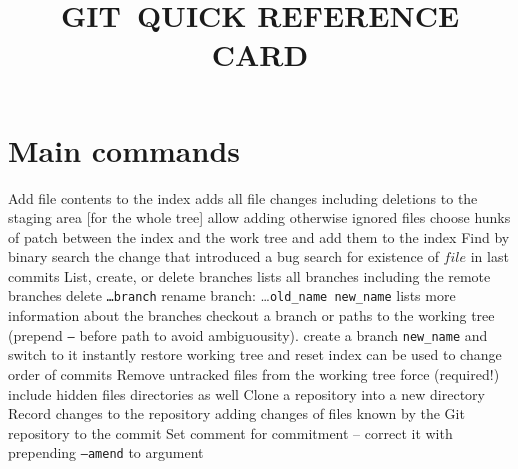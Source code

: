 
\def\content{GIT}
\def\versionnumber{1.1}  %
\def\year{2014}
\def\month{May}
\def\version{v\versionnumber\ \month\ \year}



\title{\content\ QUICK REFERENCE CARD}

\shortintro

\section{Main commands}{}
	{Add file contents to the index}
	{adds all file changes including deletions to the staging area [for the whole tree]}
	{allow adding otherwise ignored files}
	{choose hunks of patch between the index and the work tree and add them to the index}
	{Find by binary search the change that introduced a bug}
	{search for existence of $file$ in last commits}
	{List, create, or delete branches}
	{lists all branches including the remote branches}
	{delete {\tt \dots branch}}
	{rename branch: \dots {\tt old\_name new\_name}}
	{lists more information about the branches}
	{checkout a branch or paths to the working tree (prepend {\tt --} before path to avoid ambiguousity).}
	{create a branch {\tt new\_name} and switch to it instantly}
	{restore working tree and reset index}
	{can be used to change order of commits}
	{Remove untracked files from the working tree}
	{force (required!)}
	{include hidden files}
	{directories as well}
	{Clone a repository into a new directory}
	{Record changes to the repository}
	{adding changes of files known by the Git repository to the commit}
	{Set comment for commitment -- correct it with prepending {\tt --amend} to argument}
